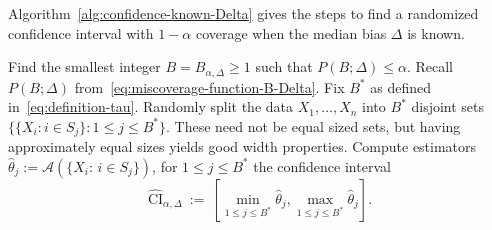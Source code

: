 \documentclass{article}
\newcommand{\hulcnospace}{\textsc{HulC}}
\numberwithin{myalgctr}{section}
\begin{document}
Algorithm~\ref{alg:confidence-known-Delta} gives the steps to find a randomized confidence interval with $1 - \alpha$ coverage when the median bias $\Delta$ is known.
\begin{algorithm}[h]
    \caption{Confidence Interval with Known $\Delta$ (\hulcnospace)}
    \label{alg:confidence-known-Delta}
    \SetAlgoLined
    \SetEndCharOfAlgoLine{}
    Find the smallest integer $B = B_{\alpha,\Delta}\ge1$ such that $P(B;\Delta) \le \alpha$. Recall $P(B; \Delta)$ from~\eqref{eq:miscoverage-function-B-Delta}.\;
    Fix $B^*$ as defined in~\eqref{eq:definition-tau}.\;
	Randomly split the data $X_1, \ldots, X_n$ into $B^*$ disjoint sets $\{\{X_i:i\in S_j\}: 1\le j\le B^*\}.$ These need not be equal sized sets, but having approximately equal sizes yields good width properties.\;
	Compute estimators $\widehat{\theta}_j := \mathcal{A}(\{X_i:\,i\in S_j\})$, for $1\le j\le B^*$\;
    \Return the confidence interval 
    \begin{equation}\label{eq:confidence-interval-known-Delta}
    \widehat{\mathrm{CI}}_{\alpha, \Delta} ~:=~ \left[\min_{1\le j\le B^*}\widehat{\theta}_j, \max_{1\le j\le B^*}\widehat{\theta}_j\right].
    \end{equation}
\end{algorithm}
\end{document}
